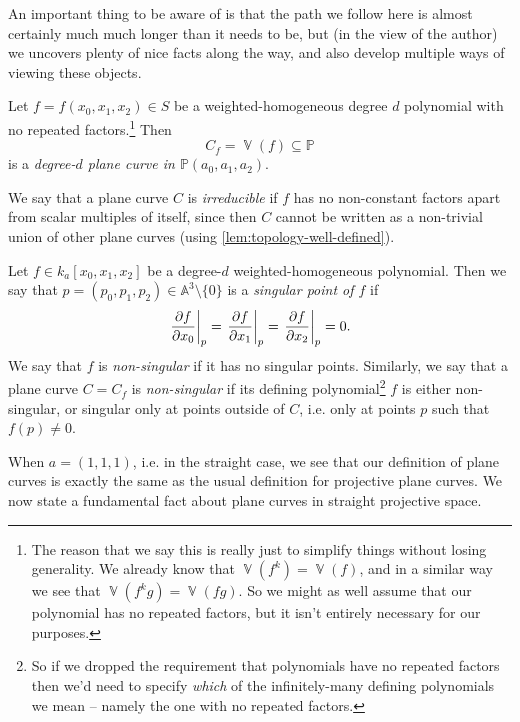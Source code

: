 \documentclass[10pt,notitlepage]{article}
\makeatletter
\let\originalsc@watermark\sc@watermark
\newcommand{\draftwatermarkon}{%
  \let\sc@watermark\originalsc@watermark
}
\numberwithin{equation}{subsection}
\DeclareMathOperator{\van}{\mathbb{V}}
\newcommand{\aff}{\mathbb{A}}
\newcommand{\pee}{\mathbb{P}}
\newcommand{\noz}{\setminus\{0\}}
\newcommand{\kathree}{k_a[x_0,x_1,x_2]}
\newcommand{\pathree}{\pee(a_0,a_1,a_2)}
\newcommand{\poly}{S}
\makeatother
\begin{document}
    An important thing to be aware of is that the path we follow here is almost certainly much much longer than it needs to be, but (in the view of the author) we uncovers plenty of nice facts along the way, and also develop multiple ways of viewing these objects.

\draftwatermarkon
    \begin{definition}\label{defn:plane-curves-in-wps}
        Let $f=f(x_0,x_1,x_2)\in\poly$ be a weighted-homogeneous degree $d$ polynomial with no repeated factors.\footnote{%
            The reason that we say this is really just to simplify things without losing generality.
            We already know that $\van(f^k)=\van(f)$, and in a similar way we see that $\van(f^k g)=\van(fg)$.
            So we might as well assume that our polynomial has no repeated factors, but it isn't entirely necessary for our purposes.
        }
        Then
        \[
            C_f = \van(f) \subseteq \pee
        \]
        is a \emph{degree-$d$ plane curve in $\pathree$}.

        We say that a plane curve $C$ is \emph{irreducible} if $f$ has no non-constant factors apart from scalar multiples of itself, since then $C$ cannot be written as a non-trivial union of other plane curves (using \cref{lem:topology-well-defined}).
    \end{definition}

    \begin{definition}
        Let $f\in\kathree$ be a degree-$d$ weighted-homogeneous polynomial.
        Then we say that $p=(p_0,p_1,p_2)\in\aff^3\noz$ is a \emph{singular point of $f$} if
        \[
        \eval{\pdv{f}{x_0}}_p = \eval{\pdv{f}{x_1}}_p = \eval{\pdv{f}{x_2}}_p = 0.
        \]
        We say that $f$ is \emph{non-singular} if it has no singular points.
        Similarly, we say that a plane curve $C=C_f$ is \emph{non-singular} if its defining polynomial\footnote{%
            So if we dropped the requirement that polynomials have no repeated factors then we'd need to specify \emph{which} of the infinitely-many defining polynomials we mean -- namely the one with no repeated factors.
        } $f$ is either non-singular, or singular only at points outside of $C$, i.e. only at points $p$ such that $f(p)\neq0$.
    \end{definition}

    When $a=(1,1,1)$, i.e. in the straight case, we see that our definition of plane curves is exactly the same as the usual definition for projective plane curves.
    We now state a fundamental fact about plane curves in straight projective space.
\end{document}
